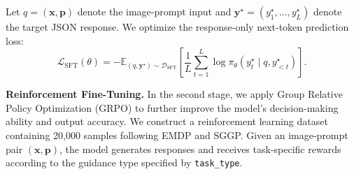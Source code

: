 \documentclass{llmxive}
\begin{document}
Let $q=(\mathbf{x},\mathbf{p})$ denote the image-prompt input and
$\mathbf{y}^{\star}=(y^{\star}_1,\ldots,y^{\star}_L)$ denote the target JSON response.
We optimize the response-only next-token prediction loss:
\begin{equation}
\mathcal{L}_{\mathrm{SFT}}(\theta)
=
-\mathbb{E}_{(q,\mathbf{y}^{\star})\sim\mathcal{D}_{\mathrm{SFT}}}
\left[
\frac{1}{L}
\sum_{t=1}^{L}
\log
\pi_{\theta}
\left(
y^{\star}_t
\mid q,y^{\star}_{<t}
\right)
\right].
\end{equation}

\textbf{Reinforcement Fine-Tuning.}
In the second stage, we apply Group Relative Policy Optimization (GRPO) to further improve the model's decision-making ability and output accuracy. We construct a reinforcement learning dataset containing 20,000 samples following EMDP and SGGP. Given an image-prompt pair $(\mathbf{x}, \mathbf{p})$, the model generates responses and receives task-specific rewards according to the guidance type specified by \texttt{task\_type}.
\end{document}
